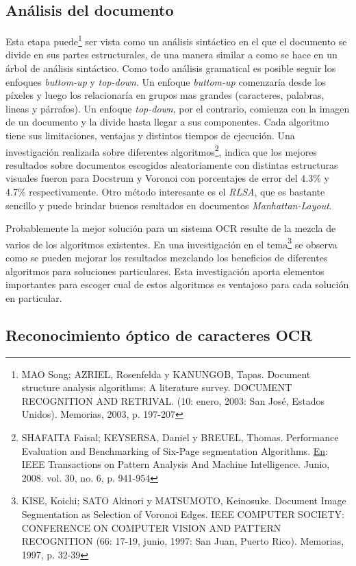 \documentclass[a4paper, 11pt, oneside]{report}
\begin{document}
\subsection{Análisis del documento}

Esta etapa puede\footnote{MAO Song; AZRIEL, Rosenfelda y KANUNGOB, Tapas. Document structure analysis algorithms: A literature survey. DOCUMENT RECOGNITION AND RETRIVAL. (10: enero, 2003: San José, Estados Unidos).  Memorias, 2003, p. 197-207} ser vista como un análisis sintáctico en el que el documento se divide en sus partes estructurales, de una manera similar a como se hace en un árbol de análisis sintáctico. Como todo análisis gramatical es posible seguir los enfoques \textit{buttom-up} y \textit{top-down}. Un enfoque \textit{buttom-up} comenzaría desde los píxeles y luego los relacionaría en grupos mas grandes (caracteres, palabras, lineas y párrafos). Un enfoque \textit{top-down}, por el contrario, comienza con la imagen de un documento y la divide hasta llegar a sus componentes. Cada algoritmo tiene sus limitaciones, ventajas y distintos tiempos de ejecución. Una investigación realizada sobre diferentes algoritmos\footnote{SHAFAITA Faisal; KEYSERSA,  Daniel y BREUEL, Thomas. Performance Evaluation and Benchmarking of Six-Page segmentation Algorithms. \underline{En}: IEEE Transactions on Pattern Analysis And Machine Intelligence.  Junio, 2008. vol. 30, no. 6, p. 941-954}, indica que los mejores resultados sobre documentos escogidos aleatoriamente con distintas estructuras visuales fueron para Docstrum y Voronoi con porcentajes de error del 4.3\% y 4.7\% respectivamente. Otro método interesante es el \textit{RLSA}, que es bastante sencillo y puede brindar buenos resultados en documentos \textit{Manhattan-Layout}. 

Probablemente la mejor solución para un sistema OCR resulte de la mezcla de varios de los algoritmos existentes. En una investigación en el tema\footnote{KISE, Koichi; SATO Akinori y MATSUMOTO,  Keinosuke. Document Image Segmentation as Selection of Voronoi Edges. IEEE COMPUTER SOCIETY: CONFERENCE ON COMPUTER VISION AND PATTERN RECOGNITION (66: 17-19, junio, 1997: San Juan,  Puerto Rico). Memorias, 1997, p. 32-39} se observa como se pueden mejorar los resultados mezclando los beneficios de diferentes algoritmos para soluciones particulares. Esta investigación aporta elementos importantes para escoger cual de estos algoritmos es ventajoso para cada solución en particular.  

\subsection{Reconocimiento óptico de caracteres OCR}
\end{document}
